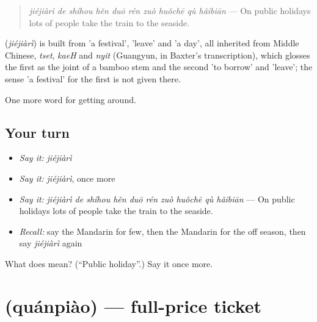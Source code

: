 \begin{quote}
\emph{jiéjiàrì de shíhou hěn duō rén zuò huǒchē qù hǎibiān} — On public holidays lots of people take the train to the seaside.
\end{quote}

\begin{cousinweb}
\textbf{} (\emph{jiéjiàrì}) is built from  'a festival',  'leave' and  'a day', all inherited from Middle Chinese, \emph{tset}, \emph{kaeH} and \emph{nyit} (Guangyun, in Baxter's transcription), which glosses the first as the joint of a bamboo stem and the second 'to borrow' and 'leave'; the sense 'a festival' for the first is not given there.
\end{cousinweb}

\begin{grammarlens}[title={What you've built}]
One more word for getting around.
\end{grammarlens}

\subsection*{Your turn}
\begin{itemize}
\raggedright
  \item \emph{Say it:} \emph{jiéjiàrì}
  \item \emph{Say it:} \emph{jiéjiàrì}, once more
  \item \emph{Say it:} \emph{jiéjiàrì de shíhou hěn duō rén zuò huǒchē qù hǎibiān} — On public holidays lots of people take the train to the seaside.
  \item \emph{Recall:} say the Mandarin for few, then the Mandarin for the off season, then say \emph{jiéjiàrì} again
\end{itemize}

\begin{tcolorbox}[breakable,colback=teal!4,colframe=teal!35!black,title={Before you move on}]
What does  mean? (\textquotedblleft{}Public holiday\textquotedblright{}.) Say it once more.
\end{tcolorbox}
\section[\texorpdfstring{\zh{全票} (quánpiào)}{全票 (quánpiào)}]{ (quánpiào) — full-price ticket}

\label{lesson:ZH-C432-quanpiao}



